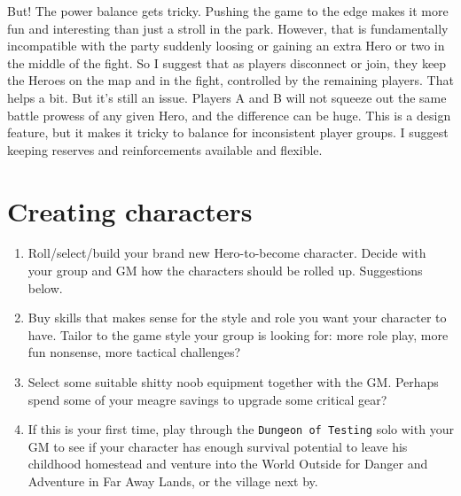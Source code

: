 But! The power balance gets tricky. Pushing the game to the edge makes it more fun and interesting than just a stroll in the park. However, that is fundamentally incompatible with the party suddenly loosing or gaining an extra Hero or two in the middle of the fight. So I suggest that as players disconnect or join, they keep the Heroes on the map and in the fight, controlled by the remaining players. That helps a bit. But it's still an issue. Players A and B will not squeeze out the same battle prowess of any given Hero, and the difference can be huge. This is a design feature, but it makes it tricky to balance for inconsistent player groups.
I suggest keeping reserves and reinforcements available and flexible.








\section*{Creating characters}
\begin{enumerate}
\item Roll/select/build your brand new Hero-to-become character. Decide with your group and GM how the characters should be rolled up. Suggestions below.
\item Buy skills that makes sense for the style and role you want your character to have. Tailor to the game style your group is looking for: more role play, more fun nonsense, more tactical challenges?
\item Select some suitable shitty noob equipment together with the GM. Perhaps spend some of your meagre savings to upgrade some critical gear?
\item If this is your first time, play through the \texttt{Dungeon of Testing} solo with your GM to see if your character has enough survival potential to leave his childhood homestead and venture into the World Outside for Danger and Adventure in Far Away Lands, or the village next by.
\end{enumerate}

